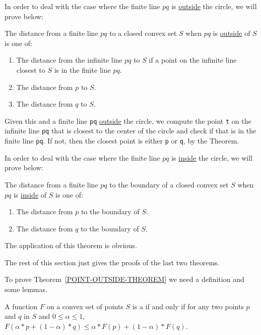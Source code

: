 \documentclass[12pt]{article}
\begin{document}
In order to deal with the case where the finite line $pq$ is
\underline{outside}
the circle, we will prove below:

\begin{theorem}\label{POINT-OUTSIDE-THEOREM}
The distance from a finite line $pq$ to a closed convex set $S$ when
$pq$ is \underline{outside} of $S$ is one of:
\begin{enumerate}
\item The distance from the infinite line $pq$ to $S$ if
a point on the infinite line closest to $S$ is in the finite line $pq$.
\item The distance from $p$ to $S$.
\item The distance from $q$ to $S$.
\end{enumerate}
\end{theorem}

Given this and a finite line {\tt pq} \underline{outside} the
circle,
we compute the point {\tt t} on the infinite line {\tt pq} that is
closest to the center of the circle
and check if that is in the finite line {\tt pq}.  If not, then the
closest point is either {\tt p} or {\tt q}, by the Theorem.

In order to deal with the case where the finite line $pq$ is
\underline{inside}
the circle, we will prove below:

\begin{theorem}\label{POINT-INSIDE-THEOREM}
The distance from a finite line $pq$ to the boundary of a
closed convex set $S$ when
$pq$ is \underline{inside} of $S$ is one of:
\begin{enumerate}
\item The distance from $p$ to the boundary of $S$.
\item The distance from $q$ to the boundary of $S$.
\end{enumerate}
\end{theorem}

The application of this theorem is obvious.

The rest of this section just gives the proofs of the last two
theorems.

To prove Theorem~\ref{POINT-OUTSIDE-THEOREM}
we need a definition and some lemmas.

\begin{definition}
A function $F$ on a convex set of points $S$ is a 
if and only if
for any two points $p$ and $q$ in $S$ and
$0\le\alpha\le 1$,
$F(\alpha*p+(1-\alpha)*q)\le\alpha*F(p) + (1-\alpha)*F(q)$.
\end{definition}
\end{document}
